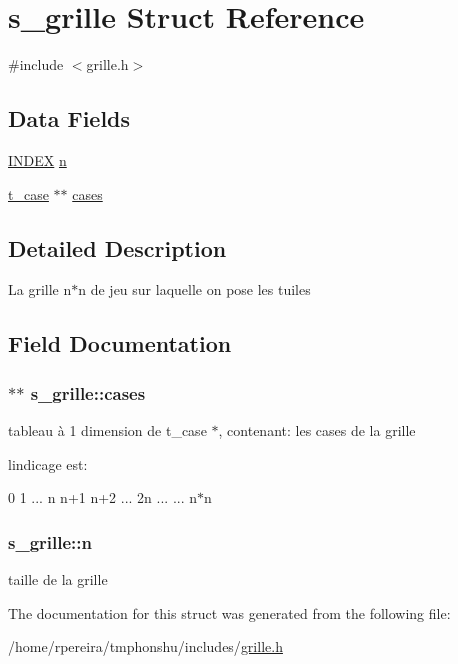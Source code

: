 \hypertarget{structs__grille}{}\section{s\+\_\+grille Struct Reference}
\label{structs__grille}


{\ttfamily \#include $<$grille.\+h$>$}

\subsection*{Data Fields}
\begin{DoxyCompactItemize}
\item 
\hyperlink{types_8h_ac6885dbfb371c33e523c7fb046118b36}{I\+N\+D\+EX} \hyperlink{structs__grille_a09b07d21d4a001c90c4f4f8025ac3965}{n}
\item 
\hyperlink{structs__case}{t\+\_\+case} $\ast$$\ast$ \hyperlink{structs__grille_a0c83208ed3489d20fb32a4bd8269328e}{cases}
\end{DoxyCompactItemize}


\subsection{Detailed Description}
La grille n$\ast$n de jeu sur laquelle on pose les tuiles 

\subsection{Field Documentation}
\subsubsection[{\texorpdfstring{cases}{cases}}]{$\ast$$\ast$ s\+\_\+grille\+::cases}\hypertarget{structs__grille_a0c83208ed3489d20fb32a4bd8269328e}{}\label{structs__grille_a0c83208ed3489d20fb32a4bd8269328e}
tableau à 1 dimension de \textquotesingle{}t\+\_\+case $\ast$\textquotesingle{}, contenant\+: les cases de la grille

l\textquotesingle{}indicage est\+:

0 1 ... n n+1 n+2 ... 2n ... ... n$\ast$n 
\subsubsection[{\texorpdfstring{n}{n}}]{ s\+\_\+grille\+::n}\hypertarget{structs__grille_a09b07d21d4a001c90c4f4f8025ac3965}{}\label{structs__grille_a09b07d21d4a001c90c4f4f8025ac3965}
taille de la grille 

The documentation for this struct was generated from the following file\+:\begin{DoxyCompactItemize}
\item 
/home/rpereira/tmphonshu/includes/\hyperlink{grille_8h}{grille.\+h}\end{DoxyCompactItemize}
